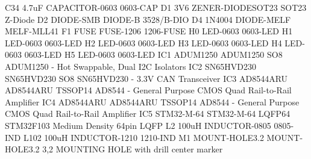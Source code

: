 \documentclass[11pt, a4paper]{article}[2009/11/13]
\begin{document}
C34     4.7uF         CAPACITOR-0603    0603-CAP                                                                                        
D1      3V6           ZENER-DIODESOT23  SOT23                 Z-Diode                                                                   
D2      DIODE-SMB     DIODE-B           3528/B-DIO                                                                                      
D4      1N4004        DIODE-MELF        MELF-MLL41                                                                                      
F1      FUSE          FUSE-1206         1206-FUSE                                                                                       
H0                    LED-0603          0603-LED                                                                                        
H1                    LED-0603          0603-LED                                                                                        
H2                    LED-0603          0603-LED                                                                                        
H3                    LED-0603          0603-LED                                                                                        
H4                    LED-0603          0603-LED                                                                                        
H5                    LED-0603          0603-LED                                                                                        
IC1     ADUM1250      ADUM1250          SO8                   ADUM1250 - Hot Swappable, Dual I2C Isolators                              
IC2     SN65HVD230    SN65HVD230        SO8                   SN65HVD230 - 3.3V CAN Transceiver                                         
IC3     AD8544ARU     AD8544ARU         TSSOP14               AD8544 - General Purpose CMOS Quad Rail-to-Rail Amplifier                 
IC4     AD8544ARU     AD8544ARU         TSSOP14               AD8544 - General Purpose CMOS Quad Rail-to-Rail Amplifier                 
IC5     STM32-M-64    STM32-M-64        LQFP64                STM32F103 Medium Density 64pin LQFP                                       
L2      100uH         INDUCTOR-0805     0805-IND                                                                                        
L102    100uH         INDUCTOR-1210     1210-IND                                                                                        
M1      MOUNT-HOLE3.2 MOUNT-HOLE3.2     3,2                   MOUNTING HOLE with drill center marker                                    
\end{document}
